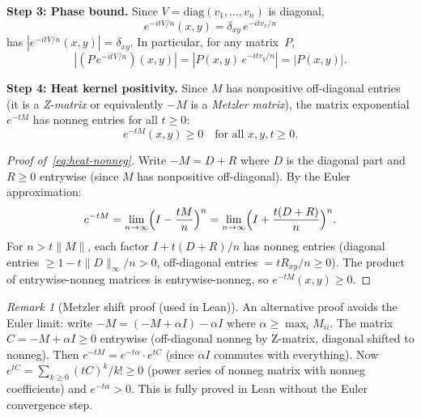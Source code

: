 \documentclass[12pt]{article}
\theoremstyle{definition}
\theoremstyle{remark}
\newtheorem{remark}[theorem]{Remark}
\begin{document}
\medskip\noindent\textbf{Step 3: Phase bound.}
Since $V = \mathrm{diag}(v_1, \ldots, v_n)$ is diagonal,
\begin{equation}
  e^{-itV/n}(x,y) = \delta_{xy}\,e^{-itv_x/n}
\end{equation}
has $|e^{-itV/n}(x,y)| = \delta_{xy}$. In particular, for any
matrix~$P$,
\begin{equation}\label{eq:phase-bound}
  |(P\,e^{-itV/n})(x,y)| = |P(x,y)\,e^{-itv_y/n}| = |P(x,y)|.
\end{equation}

\medskip\noindent\textbf{Step 4: Heat kernel positivity.}
Since $M$ has nonpositive off-diagonal entries (it is a \emph{Z-matrix}
or equivalently $-M$ is a \emph{Metzler matrix}), the matrix
exponential $e^{-tM}$ has nonneg entries for all $t \ge 0$:
\begin{equation}\label{eq:heat-nonneg}
  e^{-tM}(x,y) \ge 0 \quad\text{for all } x, y, t \ge 0.
\end{equation}

\begin{proof}[Proof of~\eqref{eq:heat-nonneg}]
Write $-M = D + R$ where $D$ is the diagonal part and $R \ge 0$
entrywise (since $M$ has nonpositive off-diagonal). By the
Euler approximation:
\begin{equation}
  e^{-tM} = \lim_{n\to\infty} \Bigl(I - \frac{tM}{n}\Bigr)^n
  = \lim_{n\to\infty} \Bigl(I + \frac{t(D+R)}{n}\Bigr)^n.
\end{equation}
For $n > t\|M\|$, each factor $I + t(D+R)/n$ has nonneg entries
(diagonal entries $\ge 1 - t\|D\|_\infty/n > 0$, off-diagonal
entries $= tR_{xy}/n \ge 0$). The product of entrywise-nonneg
matrices is entrywise-nonneg, so $e^{-tM}(x,y) \ge 0$.
\end{proof}

\begin{remark}[Metzler shift proof (used in Lean)]
An alternative proof avoids the Euler limit: write $-M = (-M+\alpha I)
- \alpha I$ where $\alpha \ge \max_i M_{ii}$. The matrix $C = -M + \alpha I
\ge 0$ entrywise (off-diagonal nonneg by Z-matrix, diagonal shifted to nonneg).
Then $e^{-tM} = e^{-t\alpha} \cdot e^{tC}$ (since $\alpha I$ commutes with
everything). Now $e^{tC} = \sum_{k\ge 0} (tC)^k/k! \ge 0$ (power series of
nonneg matrix with nonneg coefficients) and $e^{-t\alpha} > 0$.
This is fully proved in Lean without the Euler convergence step.
\end{remark}
\end{document}
